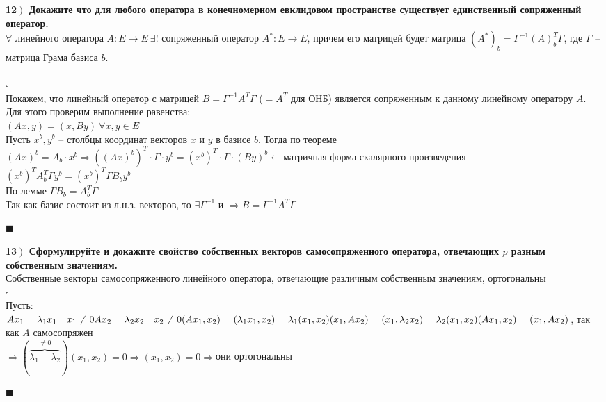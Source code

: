 \documentclass[a4paper,12pt]{article}
\begin{document}
    \textbf{12$\left.\right)$ Докажите что для любого оператора в конечномерном евклидовом пространстве существует единственный сопряженный оператор.}\\
    $\forall$ линейного оператора $A:E\rightarrow E\ \exists!$ сопряженный оператор $A^*:E\rightarrow E$, причем его матрицей будет матрица $(A^*)_b=\Gamma^{-1}(A)_b^T\Gamma$, где $\Gamma$ -- матрица Грама базиса $b$.\\\\
    $\square$\\
    Покажем, что линейный оператор с матрицей $B=\Gamma^{-1}A^T\Gamma$ ($=A^T$ для ОНБ) является сопряженным к данному линейному оператору $A$. Для этого проверим выполнение равенства:\\
    $(Ax, y)=(x, By)\ \forall x, y\in E$\\
    Пусть $x^b, y^b$ -- столбцы координат векторов $x$ и $y$ в базисе $b$. Тогда по теореме $(Ax)^b=A_b\cdot x^b\Rightarrow ((Ax)^b)^T\cdot\Gamma\cdot y^b=(x^b)^T\cdot\Gamma\cdot(By)^b\leftarrow$матричная форма скалярного произведения\\
    $(x^b)^TA_b^T\Gamma y^b=(x^b)^T\Gamma B_by^b$\\
    По лемме $\Gamma B_b=A_b^T\Gamma$\\
    Так как базис состоит из л.н.з. векторов, то $\exists\Gamma^{-1}$ и $\Rightarrow B=\Gamma^{-1} A^T\Gamma$
    \begin{flushright}
        $\blacksquare$
    \end{flushright}

    \textbf{13$\left.\right)$ Сформулируйте и докажите свойство собственных векторов самосопряженного оператора, отвечающих $p$ разным собственным значениям.}\\
    Собственные векторы самосопряженного линейного оператора, отвечающие различным собственным значениям, ортогональны\\
    $\square$\\
    Пусть:\\ $Ax_1=\lambda_1x_1\quad x_1\ne0\\
    Ax_2=\lambda_2x_2\quad x_2\ne0\\
    (Ax_1, x_2)=(\lambda_1x_1, x_2)=\lambda_1(x_1, x_2)\\
    (x_1, Ax_2)=(x_1, \lambda_2x_2)=\lambda_2(x_1, x_2)\\
    (Ax_1, x_2)=(x_1, Ax_2)$, так как $A$ самосопряжен\\
    $\Rightarrow(\overbrace{\lambda_1-\lambda_2}^{\ne0})(x_1, x_2)=0\Rightarrow(x_1, x_2)=0\Rightarrow$они ортогональны
    \begin{flushright}
        $\blacksquare$
    \end{flushright}
\end{document}
